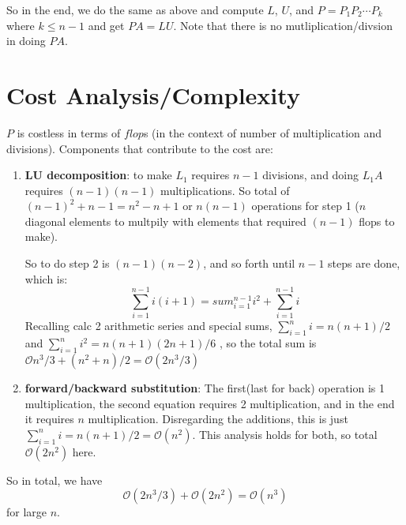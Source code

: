 So in the end, we do the same as above and compute $L$, $U$, and
$P=P_1P_2\cdots P_{k}$ where $k\le n-1$ and get $PA=LU$. Note that there is no
mutliplication/divsion in doing $PA$.

\section{Cost Analysis/Complexity}
$P$ is costless in terms of $flop$s (in the context of number of
multiplication and divisions). Components that contribute to the cost are:
\begin{enumerate}
\item \textbf{LU decomposition}: to make $L_1$ requires $n-1$ divisions, and
  doing  $L_1A$ requires $(n-1)(n-1)$ multiplications. So total of $(n-1)^2 + n-1
  = n^2-n+1$ or $n(n-1)$ operations for step 1 ($n$ diagonal elements
  to multpily with elements that required $(n-1)$ flops to make).

So to do step 2 is $(n-1)(n-2)$, and so forth until $n-1$ steps are done, which is:
$$\sum_{i=1}^{n-1} i(i+1) = sum_{i=1}^{n-1}i^2 + \sum_{i=1}^{n-1}i$$
Recalling calc 2 arithmetic series and special sums, $\sum_{i=1}^ni =
n(n+1)/2$ and $\sum_{i=1}^ni^2 =n(n+1)(2n+1)/6$ , so the total sum is
$\mathcal{O}n^3/3+(n^2+n)/2 = \mathcal{O}(2n^3/3)$
\item \textbf{forward/backward substitution}: The first(last for back)
  operation is 1 multiplication, the second equation requires 2
  multiplication, and in the end it requires $n$
  multiplication. Disregarding the additions, this is just
  $\sum_{i=1}^n i = n(n+1)/2 = \mathcal{O}(n^2)$. This analysis holds
  for both, so total $\mathcal{O}(2n^2)$ here.
\end{enumerate}
\noi
So in total, we have $$\mathcal{O}(2n^3/3) + \mathcal{O}(2n^2) =
\mathcal{O}(n^3)$$
for large $n$.

